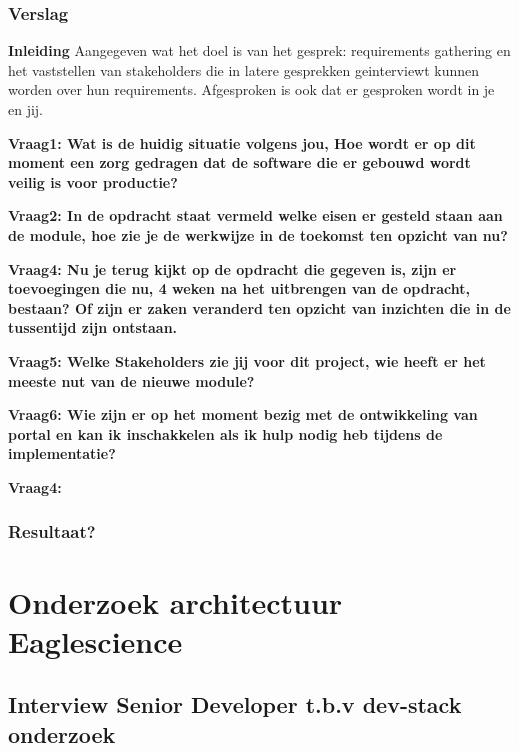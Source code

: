 \subsubsection{Verslag}
\textbf{Inleiding}
Aangegeven wat het doel is van het gesprek: requirements gathering en het vaststellen van stakeholders die in latere gesprekken geinterviewt kunnen worden over hun requirements. Afgesproken is ook dat er gesproken wordt in je en jij.

\bigskip

\textbf{Vraag1: Wat is de huidig situatie volgens jou, Hoe wordt er op dit moment een zorg gedragen dat de software die er gebouwd wordt veilig is voor productie?}

\lipsum[01]
\bigskip

\textbf{Vraag2: In de opdracht staat vermeld welke eisen er gesteld staan aan de module, hoe zie je de werkwijze in de toekomst ten opzicht van nu?}

\lipsum[03]
\bigskip

\textbf{Vraag4: Nu je terug kijkt op de opdracht die gegeven is, zijn er toevoegingen die nu, 4 weken na het uitbrengen van de opdracht, bestaan? Of zijn er zaken veranderd ten opzicht van inzichten die in de tussentijd zijn ontstaan.}

\lipsum[05]
\bigskip

\textbf{Vraag5: Welke Stakeholders zie jij voor dit project, wie heeft er het meeste nut van de nieuwe module? }

\lipsum[06]
\bigskip

\textbf{Vraag6: Wie zijn er op het moment bezig met de ontwikkeling van portal en kan ik inschakkelen als ik hulp nodig heb tijdens de implementatie?}

\lipsum[09]
\bigskip

\textbf{Vraag4: }

\lipsum[07]

\subsubsection{Resultaat?}


\section{Onderzoek architectuur Eaglescience}
\subsection{Interview Senior Developer t.b.v dev-stack onderzoek}


